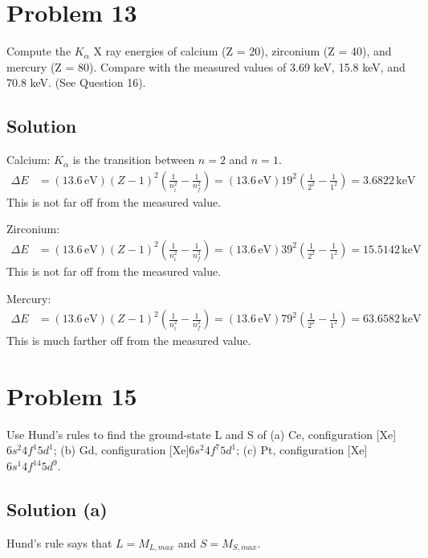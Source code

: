 \documentclass[12pt]{report}
\begin{document}
\section{Problem 13} %
    Compute the $K_\alpha$ X ray energies of calcium (Z = 20), zirconium (Z = 40), and mercury (Z = 80). 
    Compare with the measured values of 3.69 keV, 15.8 keV, and 70.8 keV. 
    (See Question 16).

    \subsection{Solution}
        Calcium:
        $K_{\alpha}$ is the transition between $n = 2$ and $n = 1$.
        \begin{align}
            \Delta E    &=  (13.6\,\unit{\eV})(Z - 1)^2\left( \frac{1}{n_i^2} - \frac{1}{n_f^2} \right)
                =   (13.6\,\unit{\eV})19^2\left( \frac{1}{2^2} - \frac{1}{1^2} \right)
                =   \boxed{3.6822\,\unit{\kilo\eV}}
        \end{align}
        This is not far off from the measured value.
        
        Zirconium:
        \begin{align}
            \Delta E    &=  (13.6\,\unit{\eV})(Z - 1)^2\left( \frac{1}{n_i^2} - \frac{1}{n_f^2} \right)
                =   (13.6\,\unit{\eV})39^2\left( \frac{1}{2^2} - \frac{1}{1^2} \right)
                =   \boxed{15.5142\,\unit{\kilo\eV}}
        \end{align}
        This is not far off from the measured value.

        Mercury:
        \begin{align}
            \Delta E    &=  (13.6\,\unit{\eV})(Z - 1)^2\left( \frac{1}{n_i^2} - \frac{1}{n_f^2} \right)
                =   (13.6\,\unit{\eV})79^2\left( \frac{1}{2^2} - \frac{1}{1^2} \right)
                =   \boxed{63.6582\,\unit{\kilo\eV}}
        \end{align}
        This is much farther off from the measured value.
    \pagebreak

\section{Problem 15} %
    Use Hund's rules to ﬁnd the ground-state L and S of (a) Ce, conﬁguration [Xe]$6s^2 4f^1 5d^1$; (b) Gd, conﬁguration [Xe]$6s^2 4f^7 5d^1$; (c) Pt, conﬁguration [Xe]$6s^1 4f^{14} 5d^9$.

    \subsection{Solution (a)}
        Hund's rule says that $L = M_{L, max}$ and $S = M_{S, max}$.
        
\end{document}
